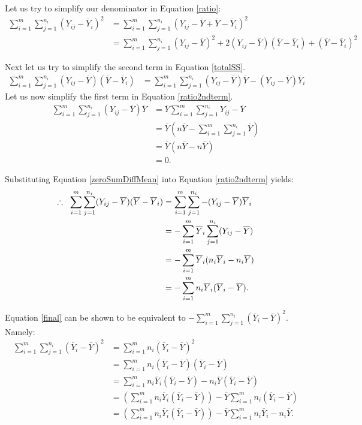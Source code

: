\documentclass[12pt,a4paper,openright]{article}
\newcommand{\eqn}[1]{Equation \ref{#1}}
\newcommand{\ovY}{\overline{Y}}
\begin{document}
	Let us try to simplify our denominator in \eqn{ratio}:
	\begin{align}
		\sum_{i=1}^m \sum_{j=1}^{n_i} (Y_{ij}-\ovY_i)^2 &= \sum_{i=1}^m \sum_{j=1}^{n_i} (Y_{ij}-\ovY+\ovY - \ovY_i)^2 \nonumber\\
		&= \sum_{i=1}^m \sum_{j=1}^{n_i} (Y_{ij}-\ovY)^2 + 2(Y_{ij}-\ovY)(\ovY - \ovY_i) + (\ovY-\ovY_i)^2 \label{totalSS}
	\end{align}

	Next let us try to simplify the second term in \eqn{totalSS}.
	\begin{align}
		\sum_{i=1}^m \sum_{j=1}^{n_i} (Y_{ij}-\ovY)(\ovY - \ovY_i) &= \sum_{i=1}^m \sum_{j=1}^{n_i} (Y_{ij}-\ovY)\ovY - (Y_{ij}-\ovY)\ovY_i \label{ratio2ndterm}
	\end{align}
	Let us now simplify the first term in \eqn{ratio2ndterm}.
	\begin{align}
		\sum_{i=1}^m \sum_{j=1}^{n_i} (Y_{ij}-\ovY)\ovY &= \ovY \sum_{i=1}^m \sum_{j=1}^{n_i} Y_{ij}-\ovY \nonumber \\
		&= \ovY (n\ovY - \sum_{i=1}^m \sum_{j=1}^{n_i} \ovY) \nonumber \\
		&= \ovY(n\ovY - n\ovY) \nonumber \\
		&= 0. \label{zeroSumDiffMean}
	\end{align}

	Substituting \eqn{zeroSumDiffMean} into \eqn{ratio2ndterm} yields:
	\begin{align}
		\therefore \hspace{0.2cm} \sum_{i=1}^m \sum_{j=1}^{n_i} (Y_{ij}-\ovY)(\ovY - \ovY_i) &= \sum_{i=1}^m \sum_{j=1}^{n_i} - (Y_{ij}-\ovY)\ovY_i \nonumber \\
		&= -\sum_{i=1}^m \ovY_i \sum_{j=1}^{n_i} (Y_{ij}-\ovY) \nonumber \\ 
		&= -\sum_{i=1}^m \ovY_i (n_i \ovY_i - n_i \ovY) \nonumber \\
		&= -\sum_{i=1}^m n_i \ovY_i (\ovY_i - \ovY).\label{final}
	\end{align}

	\eqn{final} can be shown to be equivalent to $\displaystyle -\sum_{i=1}^m \sum_{j=1}^{n_i} (\ovY_i-\ovY)^2$. Namely:
	\begin{align}
		\sum_{i=1}^m \sum_{j=1}^{n_i} (\ovY_i-\ovY)^2 &= \sum_{i=1}^m n_i (\ovY_i-\ovY)^2 \nonumber \\
		&= \sum_{i=1}^m n_i (\ovY_i - \ovY)(\ovY_i - \ovY) \nonumber \\
		&= \sum_{i=1}^m n_i \ovY_i (\ovY_i - \ovY) - n_i\ovY(\ovY_i - \ovY) \nonumber \\
		&= \left(\sum_{i=1}^m n_i \ovY_i (\ovY_i - \ovY)\right) - \ovY \sum_{i=1}^mn_i (\ovY_i-\ovY) \nonumber\\
		&= \left(\sum_{i=1}^m n_i \ovY_i (\ovY_i - \ovY)\right) - \ovY \sum_{i=1}^mn_i \ovY_i - n_i\ovY. \label{SSTEqn}
	\end{align}
\end{document}
